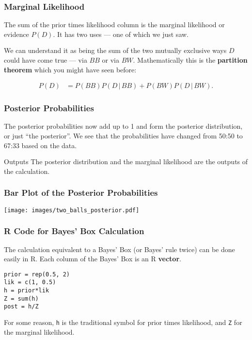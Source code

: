 \documentclass{beamer}
\newcommand{\given}{\,|\,}
\begin{document}
\begin{frame}
\frametitle{Marginal Likelihood}
The sum of the prior times likelihood column is the marginal likelihood
or evidence $P(D)$. It has two uses --- one of which we just saw.\\[0.5em]\pause

We can understand it as being the sum of the two mutually exclusive ways
$D$ could have come true --- via $BB$ or via $BW$. Mathematically this is
the {\bf partition theorem} which you might have seen before:

\begin{align}
P(D) &= P(BB)P(D \given BB) + P(BW)P(D \given BW).
\end{align}
\end{frame}


\begin{frame}
\frametitle{Posterior Probabilities}
The posterior probabilities now add up to 1 and form the posterior distribution,
or just ``the posterior''. We see that the probabilities have changed from
50:50 to 67:33 based on the data.\pause

\begin{alertblock}{Outputs}
The posterior distribution and the marginal likelihood are the outputs of the
calculation.
\end{alertblock}

\end{frame}

\begin{frame}
\frametitle{Bar Plot of the Posterior Probabilities}

\centering
\texttt{[image: images/two\_balls\_posterior.pdf]}

\end{frame}


\begin{frame}[fragile]
\frametitle{R Code for Bayes' Box Calculation}
The calculation equivalent to a Bayes' Box (or Bayes' rule twice) can be
done easily in R. Each column of the Bayes' Box is an R {\bf vector}.\pause

\begin{verbatim}
prior = rep(0.5, 2)
lik = c(1, 0.5)
h = prior*lik
Z = sum(h)
post = h/Z
\end{verbatim}
\pause
For some reason, \texttt{h} is the traditional symbol for prior times
likelihood, and \texttt{Z} for the marginal likelihood.
\end{frame}
\end{document}
